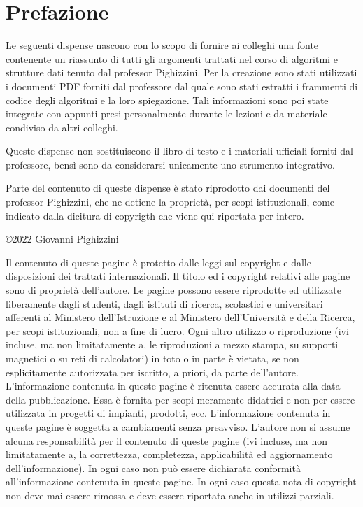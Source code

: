 \section*{Prefazione}
\thispagestyle{empty}
Le seguenti dispense nascono con lo scopo di fornire ai colleghi una fonte contenente un riassunto di tutti gli argomenti trattati nel corso di algoritmi e strutture dati tenuto dal professor Pighizzini. Per la creazione sono stati utilizzati i documenti PDF forniti dal professore dal quale sono stati estratti i frammenti di codice degli algoritmi e la loro spiegazione. Tali informazioni sono poi state integrate con appunti presi personalmente durante le lezioni e da materiale condiviso da altri colleghi. 

Queste dispense non sostituiscono il libro di testo e i materiali ufficiali forniti dal professore, bensì sono da considerarsi unicamente uno strumento integrativo.

Parte del contenuto di queste dispense è stato riprodotto dai documenti del professor Pighizzini, che ne detiene la proprietà, per scopi istituzionali, come indicato dalla dicitura di copyrigth che viene qui riportata per intero.

\vfill

\copyright 2022 Giovanni Pighizzini

{\scriptsize
Il contenuto di queste pagine è protetto dalle leggi sul copyright e dalle disposizioni dei trattati internazionali. Il titolo ed i copyright relativi alle pagine sono di proprietà dell’autore. Le pagine possono essere riprodotte ed utilizzate liberamente dagli studenti, dagli istituti di ricerca, scolastici e universitari afferenti al Ministero dell’Istruzione e al Ministero dell’Università e della Ricerca, per scopi istituzionali, non a fine di lucro. Ogni altro utilizzo o riproduzione (ivi incluse, ma non limitatamente a, le riproduzioni a mezzo stampa, su supporti magnetici o su reti di calcolatori) in toto o in parte è vietata, se non esplicitamente autorizzata per iscritto, a priori, da parte dell’autore.
L’informazione contenuta in queste pagine è ritenuta essere accurata alla data della pubblicazione. Essa è fornita per scopi meramente didattici e non per essere utilizzata in progetti di impianti, prodotti, ecc.
L’informazione contenuta in queste pagine è soggetta a cambiamenti senza preavviso. L’autore non si assume alcuna responsabilità per il contenuto di queste pagine (ivi incluse, ma non limitatamente a, la correttezza, completezza, applicabilità ed aggiornamento dell’informazione). In ogni caso non può essere dichiarata conformità all’informazione contenuta in queste pagine. In ogni caso questa nota di copyright non deve mai essere rimossa e deve essere riportata anche in utilizzi parziali.
}
\clearpage

